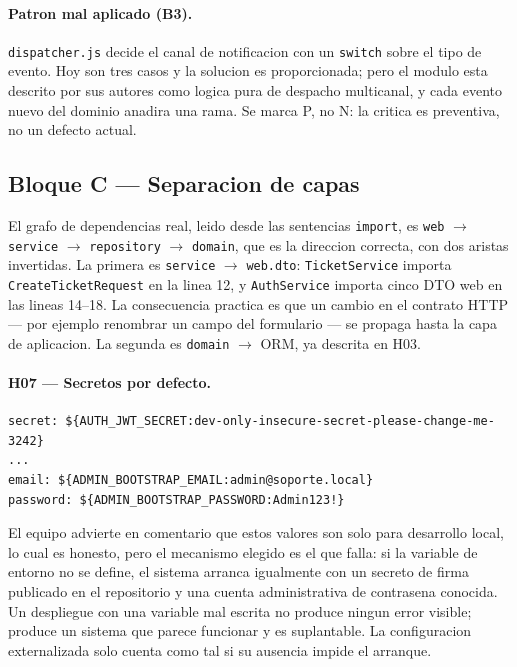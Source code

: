 \documentclass[10pt,a4paper]{article}
\begin{document}
\paragraph{Patron mal aplicado (B3).}
\texttt{dispatcher.js} decide el canal de notificacion con un \texttt{switch} sobre el tipo
de evento. Hoy son tres casos y la solucion es proporcionada; pero el modulo esta descrito
por sus autores como logica pura de despacho multicanal, y cada evento nuevo del dominio
anadira una rama. Se marca P, no N: la critica es preventiva, no un defecto actual.

\subsection{Bloque C --- Separacion de capas}

El grafo de dependencias real, leido desde las sentencias \texttt{import}, es
\texttt{web} $\rightarrow$ \texttt{service} $\rightarrow$ \texttt{repository} $\rightarrow$
\texttt{domain}, que es la direccion correcta, con dos aristas invertidas. La primera es
\texttt{service} $\rightarrow$ \texttt{web.dto}: \texttt{TicketService} importa
\texttt{CreateTicketRequest} en la linea 12, y \texttt{AuthService} importa cinco DTO web en
las lineas 14--18. La consecuencia practica es que un cambio en el contrato HTTP --- por
ejemplo renombrar un campo del formulario --- se propaga hasta la capa de aplicacion. La
segunda es \texttt{domain} $\rightarrow$ ORM, ya descrita en H03.

\paragraph{H07 --- Secretos por defecto.}
\begin{lstlisting}[caption={\texttt{auth-service/src/main/resources/application.yml}, lineas 33 y 42--43},firstnumber=33]
secret: ${AUTH_JWT_SECRET:dev-only-insecure-secret-please-change-me-3242}
...
email: ${ADMIN_BOOTSTRAP_EMAIL:admin@soporte.local}
password: ${ADMIN_BOOTSTRAP_PASSWORD:Admin123!}
\end{lstlisting}

El equipo advierte en comentario que estos valores son solo para desarrollo local, lo cual
es honesto, pero el mecanismo elegido es el que falla: si la variable de entorno no se
define, el sistema arranca igualmente con un secreto de firma publicado en el repositorio y
una cuenta administrativa de contrasena conocida. Un despliegue con una variable mal escrita
no produce ningun error visible; produce un sistema que parece funcionar y es suplantable.
La configuracion externalizada solo cuenta como tal si su ausencia impide el arranque.
\end{document}
